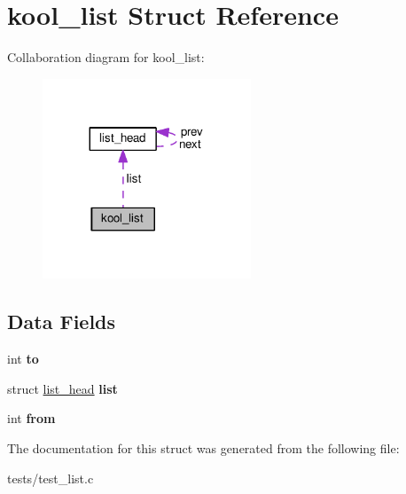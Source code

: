 \hypertarget{structkool__list}{}\section{kool\+\_\+list Struct Reference}
\label{structkool__list}


Collaboration diagram for kool\+\_\+list\+:
\nopagebreak
\begin{figure}[H]
\begin{center}
\leavevmode
\includegraphics[width=176pt]{structkool__list__coll__graph}
\end{center}
\end{figure}
\subsection*{Data Fields}
\begin{DoxyCompactItemize}
\item 
int {\bfseries to}\hypertarget{structkool__list_ac0ed249f3db34b8135fd2717bda56844}{}\label{structkool__list_ac0ed249f3db34b8135fd2717bda56844}

\item 
struct \hyperlink{structlist__head}{list\+\_\+head} {\bfseries list}\hypertarget{structkool__list_a1f00f18b91d5a820f2c43064243aa86e}{}\label{structkool__list_a1f00f18b91d5a820f2c43064243aa86e}

\item 
int {\bfseries from}\hypertarget{structkool__list_a16d981023742d3bd53f1385790714190}{}\label{structkool__list_a16d981023742d3bd53f1385790714190}

\end{DoxyCompactItemize}


The documentation for this struct was generated from the following file\+:\begin{DoxyCompactItemize}
\item 
tests/test\+\_\+list.\+c\end{DoxyCompactItemize}
